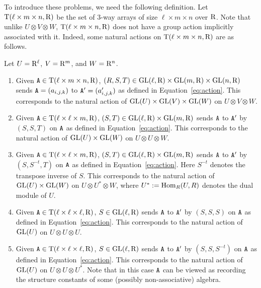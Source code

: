 To introduce these problems, we need the following definition. Let $\mathrm{T}(\ell\times m\times n, \mathrm{R})$ be the set of $3$-way arrays of size $\ell\times m\times n$ over $\mathrm{R}$. Note that unlike $U\otimes V\otimes W$, $\mathrm{T}(\ell\times m\times n, \mathrm{R})$ does not have a group action implicitly associated with it. Indeed, some natural actions on $\mathrm{T}(\ell\times m\times n, \mathrm{R})$ are as follows.
\begin{definition}\label{def:5action}
	Let $U=\mathrm{R}^\ell$, $V=\mathrm{R}^m$, and $W=\mathrm{R}^n$. 
	\begin{enumerate}
		\item Given $\mathtt{A}\in\mathrm{T}(\ell\times m\times n, \mathrm{R})$, $(R, S, T)\in\mathrm{GL}(\ell, \mathrm{R})\times\mathrm{GL}(m,\mathrm{R})\times\mathrm{GL}(n,\mathrm{R})$ %
		sends $\mathtt{A}=(a_{i,j,k})$ to $\mathtt{A}'=(a_{i,j,k}')$ as defined in Equation~\ref{eq:action}. This corresponds to the natural action of $\mathrm{GL}(U)\times\mathrm{GL}(V)\times\mathrm{GL}(W)$ on $U\otimes V\otimes W$.
		\item Given $\mathtt{A}\in\mathrm{T}(\ell\times \ell\times m, \mathrm{R})$, $(S, T)\in\mathrm{GL}(\ell, \mathrm{R})\times\mathrm{GL}(m, \mathrm{R})$ sends $\mathtt{A}$ to $\mathtt{A}'$ by $(S, S, T)$ on $\mathtt{A}$ as defined in Equation~\ref{eq:action}. This corresponds to the natural action of $\mathrm{GL}(U)\times\mathrm{GL}(W)$ on $U\otimes U\otimes W$. 
		\item Given $\mathtt{A}\in\mathrm{T}(\ell\times \ell\times m, \mathrm{R})$, $(S, T)\in\mathrm{GL}(\ell, \mathrm{R})\times\mathrm{GL}(m, \mathrm{R})$ sends $\mathtt{A}$ to $\mathtt{A}'$ by $(S, S^{-t}, T)$ on $\mathtt{A}$ as defined in Equation~\ref{eq:action}. Here $S^{-t}$ denotes the transpose inverse of $S$. This corresponds to the natural action of $\mathrm{GL}(U)\times\mathrm{GL}(W)$ on $U\otimes U^*\otimes W$, where $U^* := \mathrm{Hom}_R(U, R)$ denotes the dual module of $U$. 
		\item Given $\mathtt{A}\in\mathrm{T}(\ell\times \ell\times \ell, \mathrm{R})$, $S\in\mathrm{GL}(\ell, \mathrm{R})$ sends $\mathtt{A}$ to $\mathtt{A}'$ by $(S, S, S)$ on $\mathtt{A}$ as defined in Equation~\ref{eq:action}. This corresponds to the natural action of $\mathrm{GL}(U)$ on $U\otimes U\otimes U$.
		\item Given $\mathtt{A}\in\mathrm{T}(\ell\times \ell\times \ell, \mathrm{R})$, $S\in\mathrm{GL}(\ell, \mathrm{R})$ sends $\mathtt{A}$ to $\mathtt{A}'$ by $(S, S, S^{-t})$ on $\mathtt{A}$ as defined in Equation~\ref{eq:action}. This corresponds to the natural action of $\mathrm{GL}(U)$ on $U\otimes U\otimes U^*$. Note that in this case $\mathtt{A}$ can be viewed as recording the structure constants of some (possibly non-associative) algebra. 
	\end{enumerate}
\end{definition}

